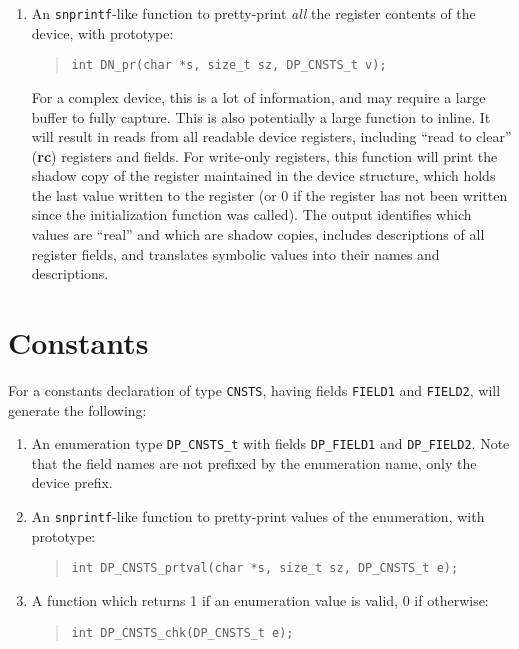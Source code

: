 \documentclass[a4paper,11pt,twoside]{report}
\begin{document}
\begin{enumerate}
\item An \texttt{snprintf}-like function to
  pretty-print \emph{all} the register contents of the device, with prototype:
  \begin{quote}
    \texttt{int DN\_pr(char *s, size\_t sz, DP\_CNSTS\_t v);}
  \end{quote}
  For a complex device, this is a lot of information, and may require a
  large buffer to fully capture.  This is also potentially a large
  function to inline.  It will result in reads from all readable device
  registers, including ``read to clear'' (\textbf{rc}) registers and
  fields.  For write-only registers, this function will print the shadow
  copy of the register maintained in the device structure, which holds
  the last value written to the register (or 0 if the register has not
  been written since the initialization function was called).  The
  output identifies which values are ``real'' and which are shadow
  copies, includes descriptions of all register fields, and translates
  symbolic values into their names and descriptions. 
\end{enumerate}

\section{Constants}

For a constants declaration of type \texttt{CNSTS}, having fields
\texttt{FIELD1} and \texttt{FIELD2}, \Mac will generate the following:

\begin{enumerate}

\item An enumeration type \texttt{DP\_CNSTS\_t} with fields
  \texttt{DP\_FIELD1} and \texttt{DP\_FIELD2}.  Note that the field
  names are not prefixed by the enumeration name, only the device
  prefix. 

\item An \texttt{snprintf}-like function to pretty-print values of the
  enumeration, with prototype:
  \begin{quote}
    \texttt{int DP\_CNSTS\_prtval(char *s, size\_t sz, DP\_CNSTS\_t e);}
  \end{quote}
      
\item A function which returns 1 if an enumeration value is valid, 0
  if otherwise:
  \begin{quote}
    \texttt{int DP\_CNSTS\_chk(DP\_CNSTS\_t e);}
  \end{quote}

\end{enumerate}
\end{document}
